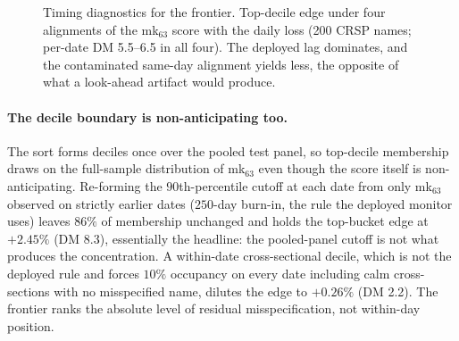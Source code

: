 \documentclass[11pt]{article}
\theoremstyle{remark}
\begin{document}
\begin{figure}[t]
\centering
{}
\caption{Timing diagnostics for the frontier. Top-decile edge under four
alignments of the mk$_{63}$ score with the daily loss (200 CRSP names;
per-date DM 5.5--6.5 in all four). The deployed lag dominates, and the
contaminated same-day alignment yields less, the opposite of what a look-ahead artifact would produce.}
\label{fig:timing}
\end{figure}

\paragraph{The decile boundary is non-anticipating too.} The sort forms deciles
once over the pooled test panel, so top-decile membership draws on the
full-sample distribution of mk$_{63}$ even though the score itself is
non-anticipating. Re-forming the $90$th-percentile cutoff at each date from only
mk$_{63}$ observed on strictly earlier dates ($250$-day burn-in, the
rule the deployed monitor uses) leaves $86\%$ of membership unchanged
and holds the top-bucket edge at $+2.45\%$ (DM 8.3), essentially the
headline: the pooled-panel cutoff is not what produces the
concentration. A within-date cross-sectional decile, which is not the
deployed rule and forces $10\%$ occupancy on every date including calm
cross-sections with no misspecified name, dilutes the edge to
$+0.26\%$ (DM 2.2). The frontier ranks the absolute level of residual
misspecification, not within-day position.
\end{document}
